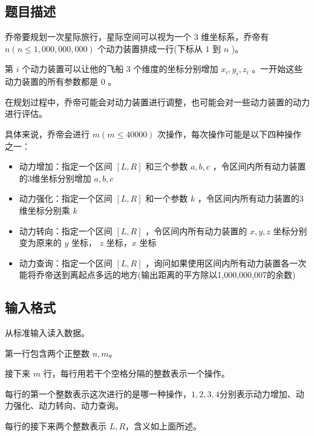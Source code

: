 \subsection*{题目描述}

乔帝要规划一次星际旅行，星际空间可以视为一个 $3$ 维坐标系，乔帝有 $n(n\leq1,000,000,000)$ 个动力装置排成一行(下标从 $1$ 到 $n$ )。

第 $i$ 个动力装置可以让他的飞船 $3$ 个维度的坐标分别增加 $x_i,y_i,z_i$ 。一开始这些动力装置的所有参数都是 $0$ 。

在规划过程中，乔帝可能会对动力装置进行调整，也可能会对一些动力装置的动力进行评估。

具体来说，乔帝会进行 $m(m\leq40000)$ 次操作，每次操作可能是以下四种操作之一：

\begin{itemize}

    \item 动力增加：指定一个区间 $[L,R]$ 和三个参数 $a,b,c$ ，令区间内所有动力装置的3维坐标分别增加 $a,b,c$



    \item 动力强化：指定一个区间 $[L,R]$ 和一个参数 $k$ ，令区间内所有动力装置的3维坐标分别乘 $k$



    \item 动力转向：指定一个区间 $[L,R]$ ，令区间内所有动力装置的 $x,y,z$ 坐标分别变为原来的 $y$ 坐标， $z$ 坐标，$x$ 坐标



    \item 动力查询：指定一个区间 $[L,R]$ ，询问如果使用区间内所有动力装置各一次能将乔帝送到离起点多远的地方(输出距离的平方除以1,000,000,007的余数)



\end{itemize}


\subsection*{输入格式}

从标准输入读入数据。

第一行包含两个正整数 $n,m$。

接下来 $m$ 行，每行用若干个空格分隔的整数表示一个操作。

每行的第一个整数表示这次进行的是哪一种操作，$1,2,3,4$分别表示动力增加、动力强化、动力转向、动力查询。

每行的接下来两个整数表示 $L,R$，含义如上面所述。

